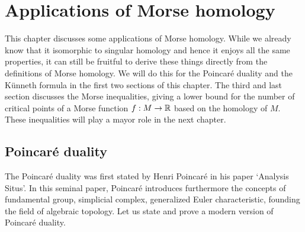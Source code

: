 \chapter{Applications of Morse homology}
\label{chap:app-morse-homology}

This chapter discusses some applications of Morse homology.
While we already know that it isomorphic to singular homology and hence it enjoys all the same properties, it can still be fruitful to derive these things directly from the definitions of Morse homology.
We will do this for the Poincaré duality and the Künneth formula in the first two sections of this chapter.
The third and last section discusses the Morse inequalities, giving a lower bound for the number of critical points of a Morse function $f: M \to  \mathbb{R}$ based on the homology of $M$.
These inequalities will play a mayor role in the next chapter.

\section{Poincaré duality}
The Poincaré duality was first stated by Henri Poincaré in his paper `Analysis Situs'.
In this seminal paper, Poincaré introduces furthermore the concepts of fundamental group, simplicial complex, generalized Euler characteristic, founding the field of algebraic topology. Let us state and prove a modern version of Poincaré duality.

